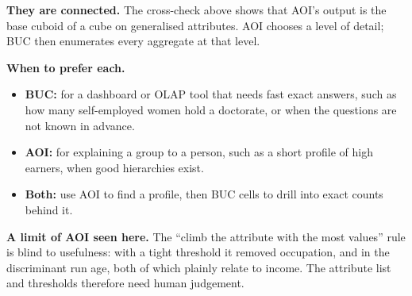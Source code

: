\documentclass[10pt]{article}
\begin{document}
\textbf{They are connected.} The cross-check above shows that AOI's output is the base cuboid of a cube on generalised attributes. AOI chooses a level of detail; BUC then enumerates every aggregate at that level.

\textbf{When to prefer each.}
\begin{itemize}
\item \textbf{BUC:} for a dashboard or OLAP tool that needs fast exact answers, such as how many self-employed women hold a doctorate, or when the questions are not known in advance.
\item \textbf{AOI:} for explaining a group to a person, such as a short profile of high earners, when good hierarchies exist.
\item \textbf{Both:} use AOI to find a profile, then BUC cells to drill into exact counts behind it.
\end{itemize}

\textbf{A limit of AOI seen here.} The ``climb the attribute with the most values'' rule is blind to usefulness: with a tight threshold it removed occupation, and in the discriminant run age, both of which plainly relate to income. The attribute list and thresholds therefore need human judgement.
\end{document}
